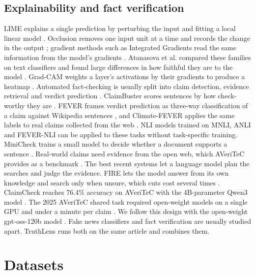 \documentclass[conference]{IEEEtran}
\begin{document}
\subsection{Explainability and fact verification}
LIME explains a single prediction by perturbing the input and fitting a local linear model \cite{ribeiro2016lime}. Occlusion removes one input unit at a time and records the change in the output \cite{zeiler2014visualizing,li2016erasure}; gradient methods such as Integrated Gradients read the same information from the model's gradients \cite{sundararajan2017ig}. Atanasova et al. compared these families on text classifiers and found large differences in how faithful they are to the model \cite{atanasova2020diagnostic}. Grad-CAM weights a layer's activations by their gradients to produce a heatmap \cite{selvaraju2017gradcam}. Automated fact-checking is usually split into claim detection, evidence retrieval and verdict prediction \cite{guo2022survey}. ClaimBuster scores sentences by how check-worthy they are \cite{hassan2017claimbuster}. FEVER frames verdict prediction as three-way classification of a claim against Wikipedia sentences \cite{thorne2018fever}, and Climate-FEVER applies the same labels to real claims collected from the web \cite{diggelmann2020climatefever}. NLI models trained on MNLI, ANLI and FEVER-NLI \cite{williams2018mnli,nie2020anli,laurer2024nli} can be applied to these tasks without task-specific training. MiniCheck trains a small model to decide whether a document supports a sentence \cite{tang2024minicheck}. Real-world claims need evidence from the open web, which AVeriTeC provides as a benchmark \cite{schlichtkrull2023averitec}. The best recent systems let a language model plan the searches and judge the evidence. FIRE lets the model answer from its own knowledge and search only when unsure, which cuts cost several times \cite{xie2025fire}. ClaimCheck reaches 76.4\% accuracy on AVeriTeC with the 4B-parameter Qwen3 model \cite{putta2025claimcheck}. The 2025 AVeriTeC shared task required open-weight models on a single GPU and under a minute per claim \cite{akhtar2025averitec}. We follow this design with the open-weight gpt-oss-120b model \cite{openai2025gptoss}. Fake news classifiers and fact verification are usually studied apart. TruthLens runs both on the same article and combines them.

\section{Datasets}
\label{sec:data}
\end{document}
